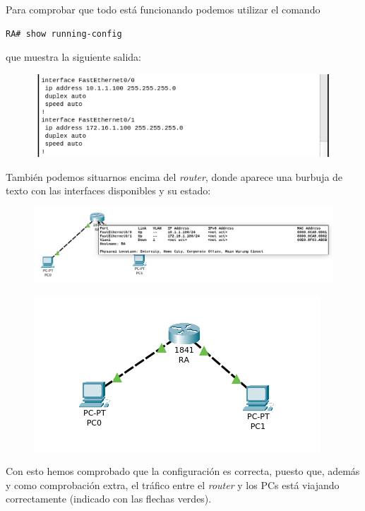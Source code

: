 \documentclass[11pt,a4paper]{article}
\begin{document}
Para comprobar que todo está funcionando podemos utilizar el comando\\

\begin{lstlisting}[language=bash]
RA# show running-config
\end{lstlisting}

que muestra la siguiente salida:

\begin{figure}[H]
	\centering
	\includegraphics[scale=0.7]{img/show_running-config.png}
\end{figure}

También podemos situarnos encima del \textit{router}, donde aparece una burbuja de texto con las interfaces disponibles y su estado:

\begin{figure}[H]
	\centering
	\includegraphics[scale=0.4]{img/bubble.png}
\end{figure}

\begin{figure}[H]
	\centering
	\includegraphics[scale=0.5]{img/topologia.png}
\end{figure}

Con esto hemos comprobado que la configuración es correcta, puesto que, además y como comprobación extra, el tráfico entre el \textit{router} y los PCs está viajando correctamente (indicado con las flechas verdes).
\end{document}
